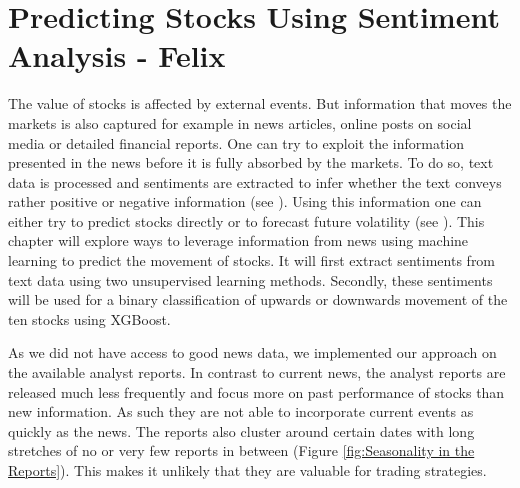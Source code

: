 \chapter{Predicting Stocks Using Sentiment Analysis - Felix} \label{ch:predictions_ml}
The value of stocks is affected by external events. But information that moves the markets is also captured for example in news articles, online posts on social media or detailed financial reports. One can try to exploit the information presented in the news before it is fully absorbed by the markets. To do so, text data is processed and sentiments are extracted to infer whether the text conveys rather positive or negative information (see \citet{HADDI201326}). Using this information one can either try to predict stocks directly or to forecast future volatility (see \citet{robertson2007news}). This chapter will explore ways to leverage information from news using machine learning to predict the movement of stocks. It will first extract sentiments from text data using two unsupervised learning methods. Secondly, these sentiments will be used for a binary classification of upwards or downwards movement of the ten stocks using XGBoost.

As we did not have access to good news data, we implemented our approach on the available analyst reports. In contrast to current news, the analyst reports are released much less frequently  and focus more on past performance of stocks than new information. As such they are not able to incorporate current events as quickly as the news. The reports also cluster around certain dates with long stretches of no or very few reports in between (Figure \ref{fig:Seasonality in the Reports}). This makes it unlikely that they are valuable for trading strategies.
\\ 
